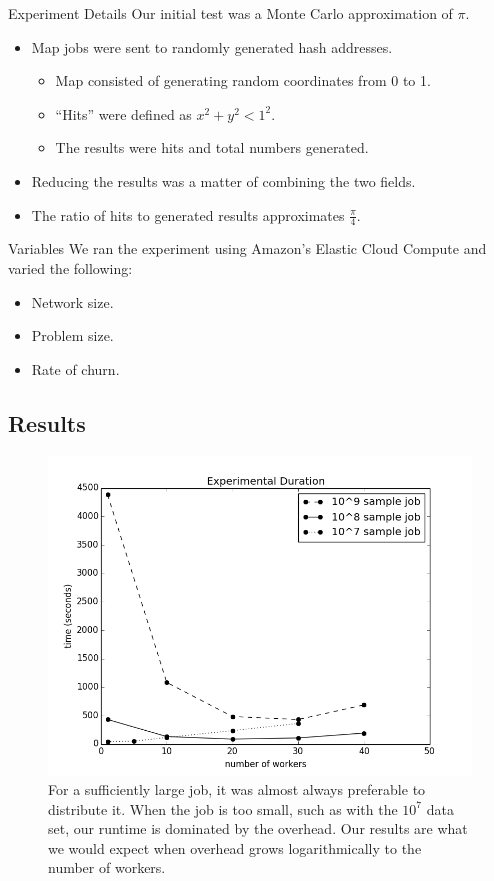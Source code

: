 \documentclass[11pt]{beamer}
\begin{document}
\begin{frame}{Experiment Details}
Our initial test was a Monte Carlo approximation of $\pi$.

\begin{itemize}
	\item Map jobs were sent to randomly generated hash addresses.
	\begin{itemize}
		\item Map consisted of generating random coordinates from 0 to 1.
		\item ``Hits'' were defined as $x^{2} + y^{2} < 1^{2}$.
		\item The results were hits and total numbers generated.
	\end{itemize}
	\item Reducing the results was a matter of combining the two fields.
	\item The ratio of hits to generated results approximates $\frac{\pi}{4}$.
\end{itemize}

\end{frame}

\begin{frame}{Variables}
We ran the experiment using Amazon's Elastic Cloud Compute \cite{amazon-instances} and varied the following:
	\begin{itemize}
		\item Network size.
		\item Problem size.
		\item Rate of churn.
	\end{itemize}
\end{frame}


\subsection{Results}


\begin{frame}
\begin{figure}
    \includegraphics[width=0.65\linewidth]{expTime}
    \caption{For a sufficiently large job, it was almost always preferable to distribute it.  When the job is too small, such as with the $10^{7}$ data set, our runtime is dominated by the overhead.  Our results are what we would expect when overhead grows logarithmically to the number of workers.}
    \label{expTime}
\end{figure}

\end{frame}
\end{document}
